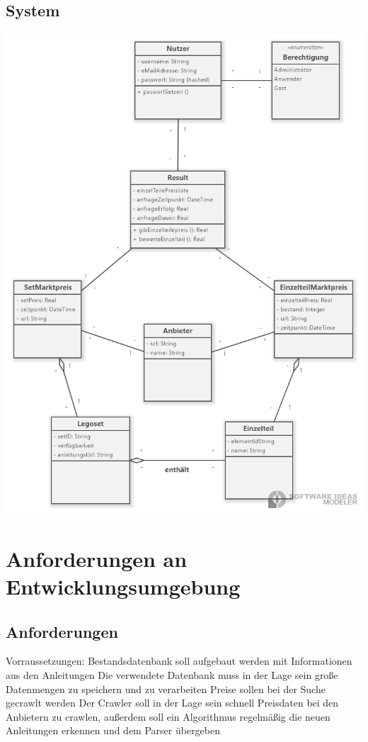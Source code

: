 \subsection{System}
\includegraphics[width=18cm]{pictures/5.1.System.png}

\section{Anforderungen an Entwicklungsumgebung}
\subsection{Anforderungen}
Vorraussetzungen: \newline
Bestandsdatenbank soll aufgebaut werden mit Informationen aus den Anleitungen \newline
Die verwendete Datenbank muss in der Lage sein große Datenmengen zu speichern und zu verarbeiten \newline
Preise sollen bei der Suche gecrawlt werden \newline
Der Crawler soll in der Lage sein schnell Preisdaten bei den Anbietern zu crawlen, außerdem soll ein Algorithmus regelmäßig die neuen Anleitungen erkennen und dem Parser übergeben \newline

